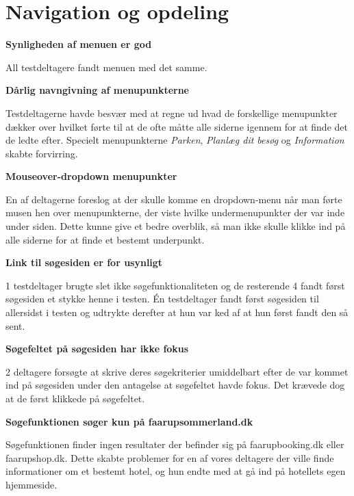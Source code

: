 \documentclass[10pt,a4paper]{article}      %
\newcommand\pic[1]{\texttt{[image: Pics/\#1]}}
\renewcommand\good{\pic{good}}
\renewcommand\goodidea{\pic{goodidea}}
\renewcommand\smallproblem{\pic{smallproblem}}
\renewcommand\seriousproblem{\pic{seriousproblem}}
\begin{document}
\section{Navigation og opdeling}
\begin{kommentarer}

\item[\good]{\textbf{Synligheden af menuen er god}}

All testdeltagere fandt menuen med det samme.

\item[\seriousproblem]{\textbf{Dårlig navngivning af menupunkterne}}

Testdeltagerne havde besvær med at regne ud hvad de forskellige
menupunkter dækker over hvilket førte til at de ofte måtte alle siderne igennem for at finde
det de ledte efter. Specielt menupunkterne \emph{Parken}, \emph{Planlæg dit besøg} og \emph{Information} skabte forvirring.

\item[\goodidea] \textbf{Mouseover-dropdown menupunkter}

En af deltagerne foreslog at der skulle komme en dropdown-menu når man førte musen hen over menupunkterne, der viste hvilke undermenupunkter der var inde under siden. Dette kunne give et bedre overblik, så man ikke skulle klikke ind på alle siderne for at finde et bestemt underpunkt.

\item[\seriousproblem]{\textbf{Link til søgesiden er for usynligt}}

1 testdeltager brugte slet ikke søgefunktionaliteten og de resterende 4 fandt først søgesiden
et stykke henne i testen. Én testdeltager fandt først søgesiden til allersidst i testen og
udtrykte derefter at hun var ked af at hun først fandt den så sent.

\item[\smallproblem]{\textbf{Søgefeltet på søgesiden har ikke fokus}}

2 deltagere forsøgte at skrive deres søgekriterier umiddelbart efter de var kommet ind på
søgesiden under den antagelse at søgefeltet havde fokus. Det krævede dog at de først klikkede
på søgefeltet.

\item[\seriousproblem]{\textbf{Søgefunktionen søger kun på faarupsommerland.dk}}

Søgefunktionen finder ingen resultater der befinder sig på faarupbooking.dk eller faarupshop.dk. Dette skabte problemer for en af vores deltagere der ville finde informationer om et bestemt hotel, og hun endte med at gå ind på hotellets egen hjemmeside.


\end{kommentarer}
\end{document}
